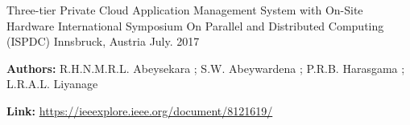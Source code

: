 

\begin{cventries}

  \cventry
    {Three-tier Private Cloud Application Management System with On-Site Hardware} %
    {International Symposium On Parallel and Distributed Computing (ISPDC)} %
    {Innsbruck, Austria} %
    {July. 2017} %
    {
      \begin{cvitems} %
        \item {\textbf{Authors: }R.H.N.M.R.L. Abeysekara ; S.W. Abeywardena ; P.R.B. Harasgama ; L.R.A.L. Liyanage}
        \item {\textbf{Link: } \url{https://ieeexplore.ieee.org/document/8121619/}}
      \end{cvitems}
    }

\end{cventries}
